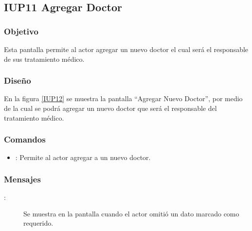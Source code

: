\subsection{IUP11 Agregar Doctor}
 
\subsubsection{Objetivo}

    Esta pantalla permite al actor agregar un nuevo doctor el cual será el responsable de sus tratamiento médico.

\subsubsection{Diseño}

    En la figura \ref{IUP12} se muestra la pantalla ``Agregar Nuevo Doctor'', por medio de la cual se podrá agregar un nuevo doctor que será el responsable del tratamiento médico. \\


\subsubsection{Comandos}
\begin{itemize}
    \item {}: Permite al actor agregar a un nuevo doctor.
    
\end{itemize}

\subsubsection{Mensajes}

\begin{description}
    \item[:] Se muestra en la pantalla  cuando el actor omitió un dato marcado como requerido.
    
\end{description}
